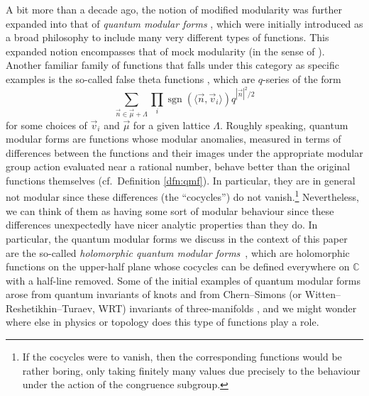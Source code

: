 \documentclass[10pt,a4paper]{amsart}
\theoremstyle{definition}
\numberwithin{equation}{section}
\begin{document}
A bit more than a decade ago, the notion of modified modularity was further expanded into that of {\it quantum modular forms} \cite{zagier2010quantum}, which were initially introduced as a broad philosophy to include many very different types of functions. This expanded notion encompasses that of mock modularity (in the sense of \cite{10.2307/procamermathsoci.144.6.2337}). Another familiar family of functions that falls under this category as specific examples is the so-called false theta functions \cite{zagier2010quantum}, which are $q$-series of the form
\[\sum_{\vec n\in \vec\mu + \Lambda} \prod_{i}\operatorname{sgn}(\langle \vec n, \vec v_i\rangle) q^{|\vec n|^2/2}\]
for some choices of $\vec v_i$ and $\vec\mu$ for a given lattice $\Lambda$. Roughly speaking, quantum modular forms are functions whose modular anomalies, measured in terms of differences between the functions and their images under the appropriate modular group action evaluated near a rational number, behave better than the original functions themselves (cf.\ Definition \ref{dfn:qmf}). In particular, they are in general not modular since these differences (the ``cocycles'') do not vanish.\footnote{If the cocycles were to vanish, then the corresponding functions would be rather boring, only taking finitely many values due precisely to the behaviour under the action of the congruence subgroup.}
Nevertheless, we can think of them as having some sort of modular behaviour since these differences unexpectedly have nicer analytic properties than they do. In particular, the quantum modular forms we discuss in the context of this paper are the so-called {\it holomorphic quantum modular forms}~\cite{ZagierHausdorf}, which are holomorphic functions on the upper-half plane whose cocycles can be defined everywhere on ${\mathbb C}$ with a half-line removed. Some of the initial examples of quantum modular forms arose from quantum invariants of knots and from Chern--Simons (or Witten--Reshetikhin--Turaev, WRT) invariants of three-manifolds \cite{lawrence1999modular}, and we might wonder where else in physics or topology does this type of functions play a role.
\end{document}
